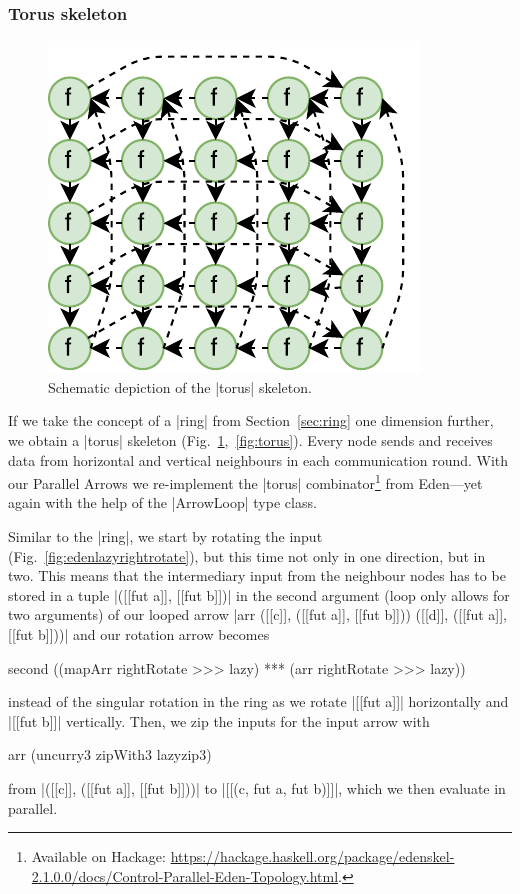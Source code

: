 \subsubsection{Torus skeleton}\label{sec:torus}
\begin{figure}
	\includegraphics[scale=0.75]{images/torus}
	\caption{Schematic depiction of the |torus| skeleton.}
	\label{fig:ringTorusImg}
\end{figure}
If we take the concept of a |ring| from Section~\ref{sec:ring} one dimension further, we obtain a |torus| skeleton (Fig.~\ref{fig:ringTorusImg},~\ref{fig:torus}). Every node sends and receives data from horizontal and vertical neighbours in each communication round.
With our Parallel Arrows we re-implement the |torus| combinator\footnote{Available on Hackage: \url{https://hackage.haskell.org/package/edenskel-2.1.0.0/docs/Control-Parallel-Eden-Topology.html}.} from Eden---yet again with the help of the |ArrowLoop| type class.

Similar to the |ring|, we start by rotating the input (Fig.~\ref{fig:edenlazyrightrotate}), but this time not only in one direction, but in two. This means that the intermediary input from the neighbour nodes has to be stored in a tuple |([[fut a]], [[fut b]])| in the second argument (loop only allows for two arguments) of our looped arrow |arr ([[c]], ([[fut a]], [[fut b]])) ([[d]], ([[fut a]], [[fut b]]))| and our rotation arrow becomes 
\begin{code}
second ((mapArr rightRotate >>> lazy) *** (arr rightRotate >>> lazy))
\end{code}
instead of the singular rotation in the ring as we rotate |[[fut a]]| horizontally and |[[fut b]]| vertically. Then, we zip the inputs for the input arrow with 
\begin{code}
arr (uncurry3 zipWith3 lazyzip3)
\end{code}
from |([[c]], ([[fut a]], [[fut b]]))| to |[[(c, fut a, fut b)]]|, which we then evaluate in parallel.

